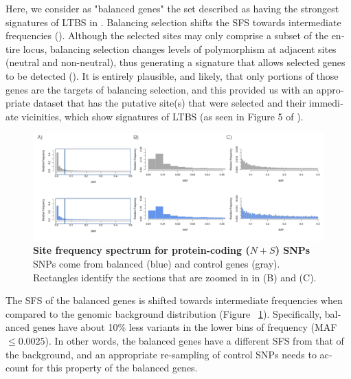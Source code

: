 \begin{refsection}
\begin{otherlanguage}{english}
Here, we consider as "balanced genes" the set described as having the strongest signatures of LTBS in \textcite{Bitarello2016}. Balancing selection shifts the SFS towards intermediate frequencies (\cite{Andres2009,Bitarello2016}). Although the selected sites may only comprise a subset of the entire locus, balancing selection changes levels of polymorphism at adjacent sites (neutral and non-neutral), thus generating a signature that allows selected genes to be detected (\cite{Bitarello2016}). It is entirely plausible, and likely, that only portions of those genes are the targets of balancing selection, and this provided us with an appropriate dataset that has the putative site(s) that were selected and their immediate vicinities, which show signatures of LTBS (as seen in Figure 5 of \cite{Bitarello2016}).


\begin{figure}
\centering
\includegraphics[width= 20 cm, keepaspectratio]
{chap3_folder/figures/SFS_chap2.png}
\caption{\textbf{Site frequency spectrum for protein-coding ($N+S$) SNPs} SNPs come from balanced (blue) and control genes (gray). Rectangles identify the sections that are zoomed in in (B) and (C). } 
\label{fig:SFS}
\end{figure}


The SFS of the balanced genes is shifted towards intermediate frequencies when compared to the genomic background distribution (Figure ~\ref{fig:SFS}). Specifically, balanced genes have about 10\% less variants in the lower bins of frequency (MAF $\leq 0.0025$). In other words, the balanced genes have a different SFS from that of the background, and an appropriate re-sampling of control SNPs needs to account for this property of the balanced genes. 


\end{otherlanguage}
\end{refsection}
